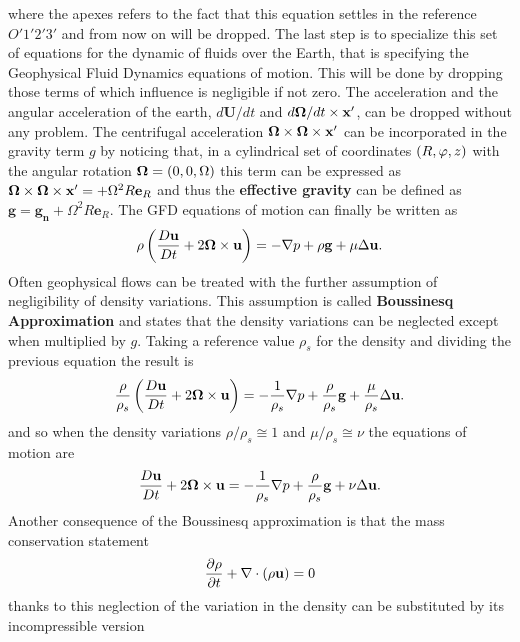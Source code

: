 where the apexes refers to the fact that this equation settles in the reference $O'1'2'3'$ and from now on will be dropped. The last step is to specialize this set of equations for the dynamic of fluids over the Earth, that is specifying the Geophysical Fluid Dynamics equations of motion. This will be done by dropping those terms of which influence is negligible if not zero. The acceleration and the angular acceleration of the earth, $d\mathbf{U}/dt$ and $d\boldsymbol{\Omega}/dt\times\mathbf{x}'$, can be dropped without any problem. The centrifugal acceleration $\boldsymbol{\Omega}\times\boldsymbol{\Omega}\times\mathbf{x}'$ can be incorporated in the gravity term $g$ by noticing that, in a cylindrical set of coordinates $\left( R,\varphi,z \right)$ with the angular rotation $\boldsymbol{\Omega}=\left( 0,0,\Omega \right)$ this term can be expressed as $\boldsymbol{\Omega}\times\boldsymbol{\Omega}\times\mathbf{x}'=+\Omega^{2}R\mathbf{e}_{R}$ and thus the \textbf{effective gravity} can be defined as $\mathbf{g}=\mathbf{g_{n}}+\Omega^{2}R\mathbf{e}_{R}$. The GFD equations of motion can finally be written as
\begin{equation}\label{GFmotion}
\rho\left( \dfrac{D\mathbf{u}}{Dt}+2\boldsymbol{\Omega}\times\mathbf{u} \right)=-\nabla p +\rho\mathbf{g}+\mu\Delta\mathbf{u}.
\end{equation}
Often geophysical flows can be treated with the further assumption of negligibility of density variations. This assumption is called \textbf{Boussinesq Approximation} and states that the density variations can be neglected except when multiplied by $g$. Taking a reference value $\rho_{s}$ for the density and dividing the previous equation the result is
\begin{equation*}
\dfrac{\rho}{\rho_{s}}\left( \dfrac{D\mathbf{u}}{Dt}+2\boldsymbol{\Omega}\times\mathbf{u} \right)=-\dfrac{1}{\rho_{s}}\nabla p +\dfrac{\rho}{\rho_{s}}\mathbf{g}+\dfrac{\mu}{\rho_{s}}\Delta\mathbf{u}.
\end{equation*}
and so when the density variations $\rho/\rho_{s}\cong1$ and $\mu/\rho_{s}\cong\nu$ the equations of motion are
\begin{equation}
\dfrac{D\mathbf{u}}{Dt}+2\boldsymbol{\Omega}\times\mathbf{u}=-\dfrac{1}{\rho_{s}}\nabla p +\dfrac{\rho}{\rho_{s}}\mathbf{g}+\nu\Delta\mathbf{u}.
\end{equation}
Another consequence of the Boussinesq approximation is that the mass conservation statement 
\begin{equation*}
\dfrac{\partial\rho}{\partial t}+\nabla\cdot\left( \rho\mathbf{u} \right)=0
\end{equation*}
thanks to this neglection of the variation in the density can be substituted by its incompressible version 
